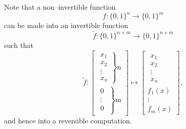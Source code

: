 Note that a non--invertible function
\begin{equation}
f\colon\lbrace 0,1\rbrace^n \to\lbrace 0,1\rbrace^m
\end{equation}
can be made into an invertible function
\begin{equation}
{\tilde f}\colon\lbrace 0,1\rbrace^{n+m} \to\lbrace 0,1\rbrace^{n+m}
\end{equation}
such that
\begin{equation}
{\tilde f}\colon
    \begin{bmatrix}
        \left.
        \begin{matrix}
            x_1\\ 
            x_2\\
            \vdots\\
            x_n
        \end{matrix}\right\rbrace\text{n}\\
        \left.
        \begin{matrix}
            0_{\phantom{i}}\\
            \vdots\\
            0_{\phantom{i}}
        \end{matrix}\right\rbrace\text{m}
    \end{bmatrix}
\mapsto
    \begin{bmatrix}
        \begin{matrix}
            x_1\\ 
            x_2\\
            \vdots\\
            x_n
        \end{matrix}\\
        f_1(x)\\
        \vdots\\
        f_m(x) 
    \end{bmatrix},
\end{equation}
and hence into a reversible computation.

